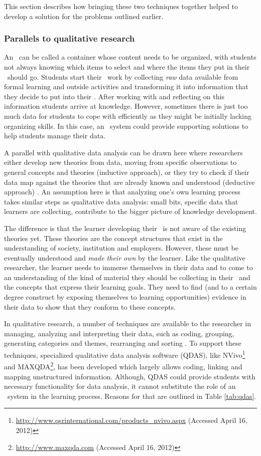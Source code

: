 This section describes how bringing these two techniques together helped to
develop a solution for the problems outlined earlier.

\subsubsection{Parallels to qualitative research}

An \ep~can be called a container whose content needs to be organized, with
students not always knowing which items to select and where the items they put
in their \ep~should go. Students start their \ep~work by collecting \textit{raw}
data available from formal learning and outside activities and transforming it
into information that they decide to put into their \ep. After working with and
reflecting on this information students arrive at knowledge. However, sometimes
there is just too much data for students to cope with efficiently as they might
be initially lacking organizing skills. In this case, an \ep~system could
provide supporting solutions to help students manage their data.

A parallel with qualitative data analysis can be drawn here where researchers
either develop new theories from data, moving from specific observations to
general concepts and theories (inductive approach), or they try to check if
their data map against the theories that are already known and understood
(deductive approach) \citep{Strauss2008,Patton2002}. An assumption here is that
analyzing one's own learning process takes similar steps as qualitative data
analysis: small bits, specific data that learners are collecting, contribute to
the bigger picture of knowledge development. 

The difference is that the learner developing their \ep~is not aware of the
existing theories yet. These theories are the concept structures that exist in
the understanding of society, institution and employers. However, these must be
eventually understood and \textit{made their own} by the learner. Like the
qualitative researcher, the learner needs to immerse themselves in their data
and to come to an understanding of the kind of material they should be
collecting in their \ep~and the concepts that express their learning goals. They
need to find (and to a certain degree construct by exposing themselves to
learning opportunities) evidence in their data to show that they conform to
these concepts.

In qualitative research, a number of techniques are available to the researcher
in managing, analyzing and interpreting their data, such as coding, grouping,
generating categories and themes, rearranging and sorting \citep{Marshall2010}.
To support these techniques, specialized qualitative data analysis software
(QDAS), like
NVivo\footnote{\url{http://www.qsrinternational.com/products_nvivo.aspx}
(Accessed April 16, 2012)} and MAXQDA\footnote{\url{http://www.maxqda.com}
(Accessed April 16, 2012)}, has been developed which largely allows coding,
linking and mapping unstructured information. Although, QDAS could provide
students with necessary functionality for data analysis, it cannot substitute
the role of an \ep~system in the learning process. Reasons for that are outlined
in Table \ref{tab:qdas}.

